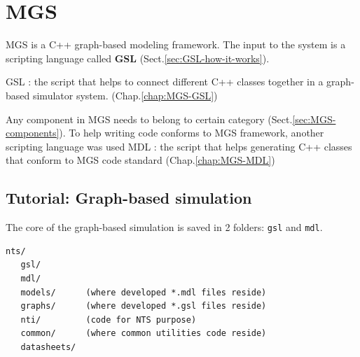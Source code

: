 \chapter{MGS}

MGS is a C++  graph-based modeling framework. The input to the system is a
scripting language called {\bf GSL} (Sect.\ref{sec:GSL-how-it-works}).

GSL : the script that helps to connect different C++ classes together in
a graph-based simulator system. (Chap.\ref{chap:MGS-GSL})

Any component in MGS needs to belong to certain category
(Sect.\ref{sec:MGS-components}). To help writing code conforms to MGS framework,
another scripting language was used MDL : the script that helps generating C++
classes that conform to MGS  code standard (Chap.\ref{chap:MGS-MDL})
  
 
  
\section{Tutorial: Graph-based simulation}
\label{sec:graph-based-simulation}

The core of the graph-based simulation is saved in 2 folders:
\verb!gsl! and \verb!mdl!.

\begin{verbatim}
nts/
   gsl/
   mdl/
   models/      (where developed *.mdl files reside)
   graphs/      (where developed *.gsl files reside)
   nti/         (code for NTS purpose)
   common/      (where common utilities code reside)
   datasheets/ 
\end{verbatim}

